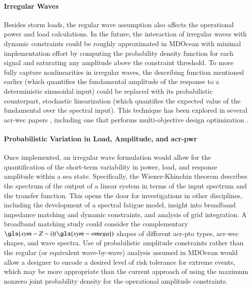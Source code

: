     \paragraph{Irregular Waves}
    Besides storm loads, the regular wave assumption also affects the operational power and load calculations.
    In the future, the interaction of irregular waves with dynamic constraints could be roughly approximated in MDOcean with minimal implementation effort by computing the probability density function for each signal and saturating any amplitude above the constraint threshold.
    To more fully capture nonlinearities in irregular waves, the describing function mentioned earlier (which quantifies the fundamental amplitude of the response to a deterministic sinusoidal input) could be replaced with its probabilistic counterpart, stochastic linearization (which quantifies the expected value of the fundamental over the spectral input).
    This technique has been explored in several \gls{acr-wec} papers \citep{da_silva_statistical_2020,da_silva_stochastic_2023,kluger_synergistic_2017,folley_spectral-domain_2016,spanos_efficient_2016}, including one that performs multi-objective design optimization \citep{neshat_enhancing_2024}.
    
    \paragraph{Probabilistic Variation in Load, Amplitude, and \gls{acr-pwr}}
    Once implemented, an irregular wave formulation would allow for the quantification of the short-term variability in power, load, and response amplitude within a sea state.
    Specifically, the Wiener-Khinchin theorem describes the spectrum of the output of a linear system in terms of the input spectrum and the transfer function.
    This opens the door for investigations in other disciplines, including the development of a spectral fatigue model, insight into broadband impedance matching and dynamic constraints, and analysis of grid integration.
    A broadband matching study could consider the complementary $\gls{sym-Z-i}(\gls{sym-omega})$ shapes of different \gls{acr-pto} types, \gls{acr-wec} shapes, and wave spectra.
    Use of probabilistic amplitude constraints rather than the regular (or equivalent wave-by-wave) analysis assumed in MDOcean would allow a designer to encode a desired level of risk tolerance for extreme events, which may be more appropriate than the current approach of using the maximum nonzero joint probability density for the operational amplitude constraints. 
    
